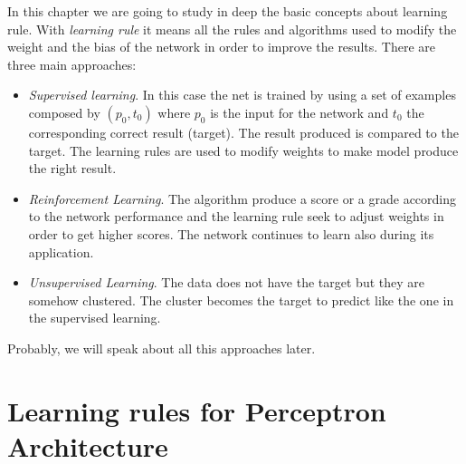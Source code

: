 In this chapter we are going to study in deep the basic concepts about learning rule. With  \textit{learning rule} it means all the rules and algorithms used to modify the weight and the bias of the network in order to improve the results.
There are three main approaches:
\begin{itemize}
\item \textit{Supervised learning}. In this case the net is trained by using a set of examples composed by $(p_0, t_0)$ where $p_0$ is the input for the network and $t_0$ the corresponding correct result (target). The result produced is compared to the target. The learning rules are used to modify weights to make model produce the right result. 
\item \textit{Reinforcement Learning}. The algorithm produce a score or a grade according to the network performance and the learning rule seek to adjust weights in order to get higher scores. The network continues to learn also during its application.  
\item \textit{Unsupervised Learning}. The data does not have the target but they are somehow clustered. The cluster becomes the target to predict like the one in the supervised learning.
\end{itemize}

Probably, we will speak about all this approaches later.

\section{Learning rules for Perceptron Architecture}

